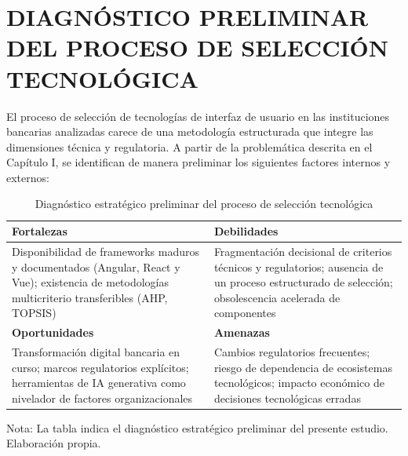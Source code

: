 \section{DIAGNÓSTICO PRELIMINAR DEL PROCESO DE SELECCIÓN TECNOLÓGICA}

El proceso de selección de tecnologías de interfaz de usuario en las
instituciones bancarias analizadas carece de una metodología estructurada que
integre las dimensiones técnica y regulatoria. A partir de la problemática
descrita en el Capítulo I, se identifican de manera preliminar los siguientes
factores internos y externos:

\begin{table}[htbp]
\centering
\caption{Diagnóstico estratégico preliminar del proceso de selección tecnológica}
\label{tab:3.foda}
\small
\begin{tabular}{|p{6.2cm}|p{6.2cm}|}
\hline
\textbf{Fortalezas} & \textbf{Debilidades} \\ \hline
Disponibilidad de frameworks maduros y documentados (Angular, React y Vue);
existencia de metodologías multicriterio transferibles (AHP, TOPSIS) &
Fragmentación decisional de criterios técnicos y regulatorios; ausencia de un
proceso estructurado de selección; obsolescencia acelerada de componentes \\ \hline
\textbf{Oportunidades} & \textbf{Amenazas} \\ \hline
Transformación digital bancaria en curso; marcos regulatorios explícitos;
herramientas de IA generativa como nivelador de factores organizacionales &
Cambios regulatorios frecuentes; riesgo de dependencia de ecosistemas
tecnológicos; impacto económico de decisiones tecnológicas erradas \\ \hline
\end{tabular}
\end{table}

\noindent Nota: La tabla indica el diagnóstico estratégico preliminar del
presente estudio. Elaboración propia.

